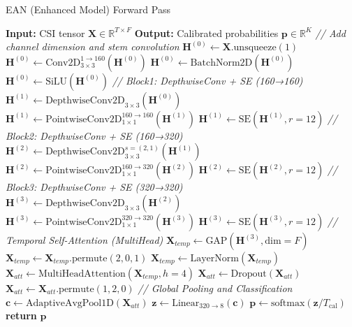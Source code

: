 \documentclass[lettersize,journal]{IEEEtran}
\begin{document}
\begin{algorithm}
\caption{EAN (Enhanced Model) Forward Pass}
\label{alg:enhanced}
\begin{algorithmic}[1]
\STATE \textbf{Input:} CSI tensor $\mathbf{X} \in \mathbb{R}^{T \times F}$  %
\STATE \textbf{Output:} Calibrated probabilities $\mathbf{p} \in \mathbb{R}^K$
\STATE
\STATE \textit{// Add channel dimension and stem convolution}
\STATE $\mathbf{H}^{(0)} \leftarrow \mathbf{X}.\text{unsqueeze}(1)$ \COMMENT{[B, 1, T, F]}
\STATE $\mathbf{H}^{(0)} \leftarrow \text{Conv2D}_{3 \times 3}^{1 \rightarrow 160}(\mathbf{H}^{(0)})$ 
\STATE $\mathbf{H}^{(0)} \leftarrow \text{BatchNorm2D}(\mathbf{H}^{(0)})$
\STATE $\mathbf{H}^{(0)} \leftarrow \text{SiLU}(\mathbf{H}^{(0)})$
\STATE
\STATE \textit{// Block1: DepthwiseConv + SE (160→160)}
\STATE $\mathbf{H}^{(1)} \leftarrow \text{DepthwiseConv2D}_{3 \times 3}(\mathbf{H}^{(0)})$
\STATE $\mathbf{H}^{(1)} \leftarrow \text{PointwiseConv2D}_{1 \times 1}^{160 \rightarrow 160}(\mathbf{H}^{(1)})$
\STATE $\mathbf{H}^{(1)} \leftarrow \text{SE}(\mathbf{H}^{(1)}, r=12)$ 
\STATE
\STATE \textit{// Block2: DepthwiseConv + SE (160→320)}
\STATE $\mathbf{H}^{(2)} \leftarrow \text{DepthwiseConv2D}_{3 \times 3}^{s=(2,1)}(\mathbf{H}^{(1)})$
\STATE $\mathbf{H}^{(2)} \leftarrow \text{PointwiseConv2D}_{1 \times 1}^{160 \rightarrow 320}(\mathbf{H}^{(2)})$
\STATE $\mathbf{H}^{(2)} \leftarrow \text{SE}(\mathbf{H}^{(2)}, r=12)$ 
\STATE
\STATE \textit{// Block3: DepthwiseConv + SE (320→320)}
\STATE $\mathbf{H}^{(3)} \leftarrow \text{DepthwiseConv2D}_{3 \times 3}(\mathbf{H}^{(2)})$
\STATE $\mathbf{H}^{(3)} \leftarrow \text{PointwiseConv2D}_{1 \times 1}^{320 \rightarrow 320}(\mathbf{H}^{(3)})$
\STATE $\mathbf{H}^{(3)} \leftarrow \text{SE}(\mathbf{H}^{(3)}, r=12)$ 
\STATE
\STATE \textit{// Temporal Self-Attention (MultiHead)}
\STATE $\mathbf{X}_{temp} \leftarrow \text{GAP}(\mathbf{H}^{(3)}, \text{dim}=F)$ \COMMENT{[B, 320, T]}
\STATE $\mathbf{X}_{temp} \leftarrow \mathbf{X}_{temp}.\text{permute}(2, 0, 1)$ \COMMENT{[T, B, 320]}
\STATE $\mathbf{X}_{temp} \leftarrow \text{LayerNorm}(\mathbf{X}_{temp})$ 
\STATE $\mathbf{X}_{att} \leftarrow \text{MultiHeadAttention}(\mathbf{X}_{temp}, h=4)$ 
\STATE $\mathbf{X}_{att} \leftarrow \text{Dropout}(\mathbf{X}_{att})$
\STATE $\mathbf{X}_{att} \leftarrow \mathbf{X}_{att}.\text{permute}(1, 2, 0)$ \COMMENT{[B, 320, T]}
\STATE
\STATE \textit{// Global Pooling and Classification}
\STATE $\mathbf{c} \leftarrow \text{AdaptiveAvgPool1D}(\mathbf{X}_{att})$ \COMMENT{[B, 320]}
\STATE $\mathbf{z} \leftarrow \text{Linear}_{320 \rightarrow 8}(\mathbf{c})$ 
\STATE $\mathbf{p} \leftarrow \text{softmax}(\mathbf{z} / T_{\text{cal}})$ 
\STATE \textbf{return} $\mathbf{p}$
\end{algorithmic}
\end{algorithm}
\end{document}
